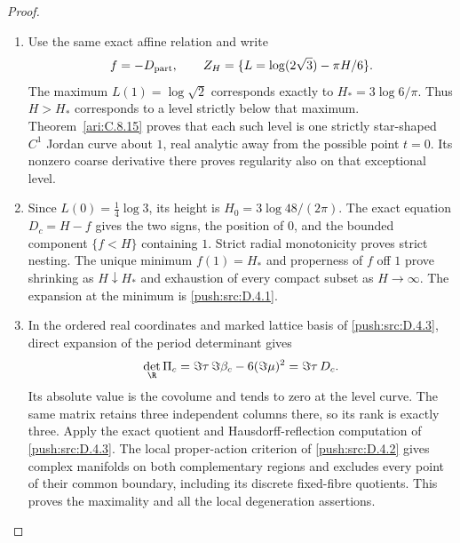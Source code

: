 \begin{proof}
\begin{enumerate}[label=\arabic*.,leftmargin=*]
\item Use the same exact affine relation and write
\[
 f=-D_{\rm part},\qquad
 Z_H=\{L=\log(2\sqrt3)-\pi H/6\}.
\]
The maximum $L(1)=\log\sqrt2$ corresponds exactly to
$H_*=3\log6/\pi$. Thus $H>H_*$ corresponds to a level
strictly below that maximum. Theorem~\ref{ari:C.8.15} proves
that each such level is one strictly star-shaped $C^1$ Jordan
curve about $1$, real analytic away from the possible point
$t=0$. Its nonzero coarse derivative there proves regularity
also on that exceptional level.

\item Since $L(0)=\tfrac14\log3$, its height is
$H_0=3\log48/(2\pi)$. The exact equation $D_c=H-f$ gives
the two signs, the position of $0$, and the bounded component
$\{f<H\}$ containing $1$. Strict radial monotonicity proves
strict nesting. The unique minimum $f(1)=H_*$ and properness
of $f$ off $1$ prove shrinking as $H\downarrow H_*$ and
exhaustion of every compact subset as $H\to\infty$.
The expansion at the minimum is \ref{push:src:D.4.1}.

\item In the ordered real coordinates and marked lattice basis of
\ref{push:src:D.4.3}, direct expansion of the period determinant
gives
\[
 \det_{\R}\Pi_c
   =\Im\tau\,\Im\beta_c-6(\Im\mu)^2
   =\Im\tau\,D_c.
\]
Its absolute value is the covolume and tends to zero at the
level curve. The same matrix retains three independent columns
there, so its rank is exactly three. Apply the exact quotient
and Hausdorff-reflection computation of \ref{push:src:D.4.3}.
The local proper-action criterion of \ref{push:src:D.4.2}
gives complex manifolds on both complementary regions and
excludes every point of their common boundary, including its
discrete fixed-fibre quotients. This proves the maximality and
all the local degeneration assertions.
\end{enumerate}
\end{proof}



